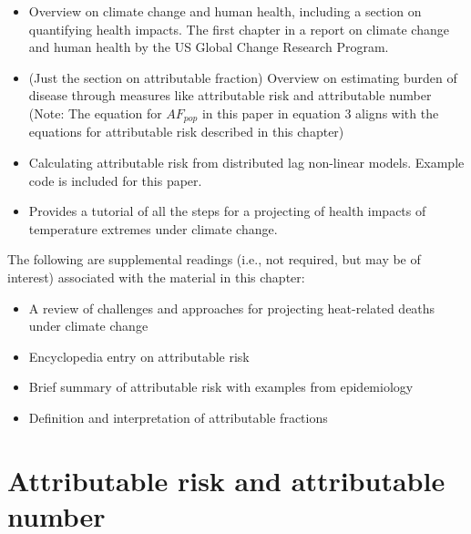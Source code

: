 \documentclass[
]{book}
\providecommand{\tightlist}{%
  \setlength{\itemsep}{0pt}\setlength{\parskip}{0pt}}
\begin{document}
\begin{itemize}
\tightlist
\item
  \citet{balbus2016climate} Overview on climate change and human health, including a section on quantifying health impacts. The first chapter in a report on climate change and human health by the US Global Change Research Program.
\item
  \citet{steenland2006overview} (Just the section on attributable fraction) Overview on estimating burden of disease through measures like attributable risk and attributable number (Note: The equation for \(AF_{pop}\) in this paper in equation 3 aligns with the equations for attributable risk described in this chapter)
\item
  \citet{gasparrini2014attributable} Calculating attributable risk from distributed lag non-linear models. Example code is included for this paper.
\item
  \citet{vicedo2019hands} Provides a tutorial of all the steps for a
  projecting of health impacts of temperature extremes under climate change.
\end{itemize}

The following are supplemental readings (i.e., not required, but may be of
interest) associated with the material in this chapter:

\begin{itemize}
\tightlist
\item
  \citet{kinney2008approaches} A review of challenges and approaches for projecting heat-related deaths under climate change
\item
  \citet{benichou2006attributable} Encyclopedia entry on attributable risk
\item
  \citet{northridge1995public} Brief summary of attributable risk with examples from epidemiology
\item
  \citet{greenland1988conceptual} Definition and interpretation of attributable fractions
\end{itemize}

\hypertarget{attributable-risk-and-attributable-number}{%
\section{Attributable risk and attributable number}\label{attributable-risk-and-attributable-number}}
\end{document}
